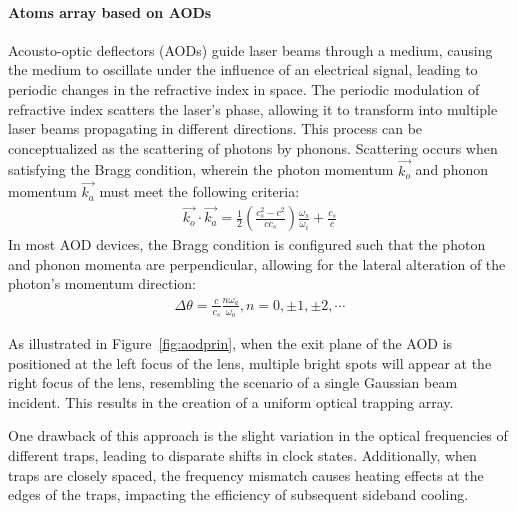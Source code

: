 \documentclass[11pt]{article}
\begin{document}
\paragraph{Atoms array based on AODs}
Acousto-optic deflectors (AODs) guide laser beams through a medium, causing the medium to oscillate under the influence of an electrical signal, leading to periodic changes in the refractive index in space. The periodic modulation of refractive index scatters the laser's phase, allowing it to transform into multiple laser beams propagating in different directions. This process can be conceptualized as the scattering of photons by phonons. Scattering occurs when satisfying the Bragg condition, wherein the photon momentum $\Vec{k_o}$ and phonon momentum $\Vec{k_a}$ must meet the following criteria:
\begin{align}
    \Vec{k_o} \cdot \Vec{k_a} = \frac{1}{2}(\frac{c_s^2 - c^2}{cc_s})\frac{\omega_s}{\omega_i} + \frac{c_s}{c}
\end{align}
In most AOD devices, the Bragg condition is configured such that the photon and phonon momenta are perpendicular, allowing for the lateral alteration of the photon's momentum direction:
\begin{align}
    \Delta \theta = \frac{c}{c_s} \frac{n\omega_a}{\omega_o}, n = 0,\pm 1,\pm 2,\cdots
\end{align}

As illustrated in Figure~\ref{fig:aodprin}, when the exit plane of the AOD is positioned at the left focus of the lens, multiple bright spots will appear at the right focus of the lens, resembling the scenario of a single Gaussian beam incident. This results in the creation of a uniform optical trapping array.

One drawback of this approach is the slight variation in the optical frequencies of different traps, leading to disparate shifts in clock states. Additionally, when traps are closely spaced, the frequency mismatch causes heating effects at the edges of the traps, impacting the efficiency of subsequent sideband cooling.
\end{document}

